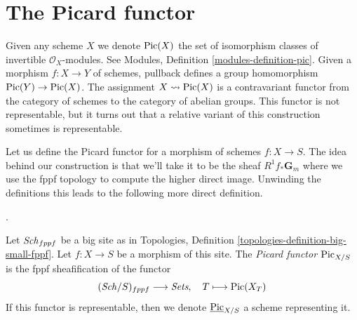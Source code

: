 \section{The Picard functor}
\label{section-picard-functor}

\noindent
Given any scheme $X$ we denote $\mathop{\mathrm{Pic}}\nolimits(X)$ the set of isomorphism
classes of invertible $\mathcal{O}_X$-modules.
See Modules, Definition \ref{modules-definition-pic}.
Given a morphism $f : X \to Y$ of schemes, pullback defines
a group homomorphism $\mathop{\mathrm{Pic}}\nolimits(Y) \to \mathop{\mathrm{Pic}}\nolimits(X)$.
The assignment
$X \leadsto \mathop{\mathrm{Pic}}\nolimits(X)$ is a contravariant functor from the category
of schemes to the category of abelian groups. This functor is not
representable, but it turns out that a relative variant of this
construction sometimes is representable.

\medskip\noindent
Let us define the Picard functor for a morphism of schemes $f : X \to S$.
The idea behind our construction is that we'll take it to be the sheaf
$R^1f_*\mathbf{G}_m$ where we use the fppf topology to compute the higher
direct image. Unwinding the definitions this leads to the following more
direct definition.

\begin{definition}
\label{definition-picard-functor}
\begin{reference}
\cite[Expos\'e 232, Section 1, pp. 143--146]{FGA}.
\end{reference}
Let $\mathit{Sch}_{fppf}$ be a big site as in
Topologies, Definition \ref{topologies-definition-big-small-fppf}.
Let $f : X \to S$ be a morphism of this site. The {\it Picard functor}
$\mathrm{Pic}_{X/S}$ is the fppf sheafification of the functor
$$
(\mathit{Sch}/S)_{fppf} \longrightarrow \textit{Sets},\quad
T \longmapsto \mathop{\mathrm{Pic}}\nolimits(X_T)
$$
If this functor is representable, then we denote
$\underline{\mathrm{Pic}}_{X/S}$ a scheme representing it.
\end{definition}

